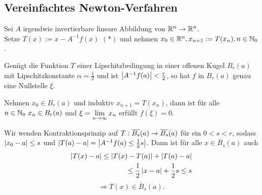 \documentclass[../ana2.tex]{subfiles}
\begin{document}
\subsection*{Vereinfachtes Newton-Verfahren}
Sei \(A\) irgendwie invertierbare lineare Abbildung von 
\( \mathbb{R}^n \rightarrow \mathbb{R}^n \).\\
Setze \( T(x) := x - A^{-1} f(x) \) \((*)\) 
und nehmen \( x_0 \in \mathbb{R}^n, x_{n+1} := T(x_n), n\in \mathbb{N}_0 \).
\begin{satz}
    Genügt die Funktion \(T\) einer Lipschitzbedingung
    in einer offenen Kugel \( B_r(a) \) mit 
    Lipschitzkonstante \( \alpha = \frac{1}{2} \) 
    und ist \(\left|A^{-1} f(a)\right| < \frac{r}{2}\), so hat \(f\)
    in \(B_r(a)\) genau eine Nullstelle \(\xi\).    
\end{satz}
Nehmen \( x_0 \in B_r(a) \) und induktiv 
\( x_{n+1} = T(x_n) \), dann ist für alle \( n \in \mathbb{N}_0 \ x_n \in B_r(a) \) 
und \( \xi = \lim\limits_{n\rightarrow\infty} x_n \) erfüllt \( f(\xi) = 0 \).
\begin{bew}
    Wir wenden Kontraktionsprinzip auf \( T:\overline{B_s}(a)\rightarrow \overline{B_s}(a) \) 
    für ein \( 0 < s < r \), sodass \( \left|x_0 - a\right| \leq s \) 
    und \( \left| T(a) - a \right| = \left| A^{-1} f(a) \leq \frac{1}{2}s \right| \).
    Dann ist für alle \(x \in \overline{B}_s(a)\) auch
    \begin{align*}
        \left|T(x)-a\right| \leq \left|T(x)-T(a)\right| + \left|T(a)-a\right|\\
        \leq \frac{1}{2} \left|x-a\right| + \frac{1}{2}s \leq s
    \end{align*}
    \[ \Rightarrow T(x) \in \overline{B}_s(a). \]
\end{bew}
\end{document}
